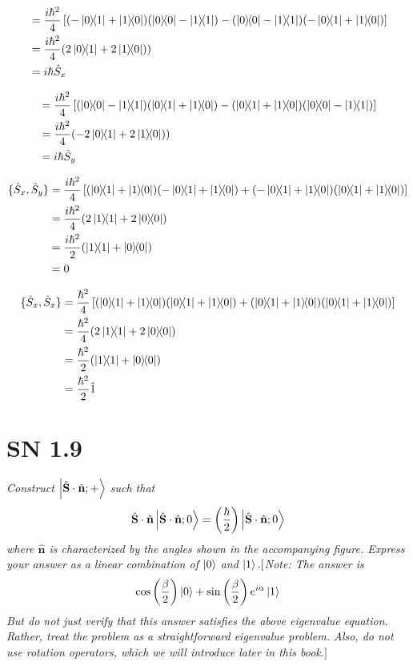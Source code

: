 \documentclass{article}
\begin{document}
\begin{align*}
    [\hat{S}_y, \hat{S}_z] &= \frac{i \hbar^2 }{4}\left[(-\ketbra{0}{1}+\ketbra{1}{0})(\ketbra{0}{0}-\ketbra{1}{1}) - (\ketbra{0}{0}-\ketbra{1}{1})(-\ketbra{0}{1}+\ketbra{1}{0})\right]\\
    &= \frac{i \hbar^2 }{4} (2\ketbra{0}{1}+2\ketbra{1}{0}) )\\
    &= i \hbar \hat{S}_x 
\end{align*}

\begin{align*}
    [\hat{S}_z, \hat{S}_x] &= \frac{i \hbar^2 }{4}\left[(\ketbra{0}{0}-\ketbra{1}{1})(\ketbra{0}{1}+\ketbra{1}{0}) - (\ketbra{0}{1}+\ketbra{1}{0})(\ketbra{0}{0}-\ketbra{1}{1})\right]\\
    &= \frac{i \hbar^2 }{4}(-2\ketbra{0}{1}+2\ketbra{1}{0}))\\
    &= i \hbar \hat{S}_y 
\end{align*}

\begin{align*}
    \{\hat{S}_x, \hat{S}_y\} &= \frac{i \hbar^2 }{4}\left[(\ketbra{0}{1}+\ketbra{1}{0})(-\ketbra{0}{1}+\ketbra{1}{0}) + (-\ketbra{0}{1}+\ketbra{1}{0})(\ketbra{0}{1}+\ketbra{1}{0})\right]\\
    &= \frac{i \hbar^2 }{4} (2\ketbra{1}{1} +  2 \ketbra{0}{0} )\\
    &= \frac{i \hbar^2 }{2} (\ketbra{1}{1} +   \ketbra{0}{0} )\\
    &= 0
\end{align*}

\begin{align*}
    \{\hat{S}_x, \hat{S}_x\} &= \frac{ \hbar^2 }{4}\left[(\ketbra{0}{1}+\ketbra{1}{0})(\ketbra{0}{1}+\ketbra{1}{0}) + (\ketbra{0}{1}+\ketbra{1}{0})(\ketbra{0}{1}+\ketbra{1}{0})\right]\\
    &= \frac{ \hbar^2 }{4} (2\ketbra{1}{1} +  2 \ketbra{0}{0} )\\
    &= \frac{ \hbar^2 }{2} (\ketbra{1}{1} +   \ketbra{0}{0} )\\
    &=  \frac{ \hbar^2 }{2} \hat 1
\end{align*}




\newpage

\section{SN 1.9}
\textit{Construct $\ket{\hat{\mathbf{S}} \cdot \hat{\mathbf{n}} ;+}$ such that
$$
\hat{\mathbf{S}} \cdot \hat{\mathbf{n}}\ket{\hat{\mathbf{S}} \cdot \hat{\mathbf{n}} ;0}=\left(\frac{\hbar}{2}\right)\ket{\hat{\mathbf{S}} \cdot \hat{\mathbf{n}} ;0}
$$
where $\hat{\mathbf{n}}$ is characterized by the angles shown in the accompanying figure. Express your answer as a linear combination of $\ket{0}$ and $\ket{1} .[$Note: The answer is
$$
\cos \left(\frac{\beta}{2}\right)\ket{0}+\sin \left(\frac{\beta}{2}\right) e^{i \alpha}\ket{1}
$$
But do not just verify that this answer satisfies the above eigenvalue equation. Rather, treat the problem as a straightforward eigenvalue problem. Also, do not use rotation operators, which we will introduce later in this book.$]$}
\end{document}
